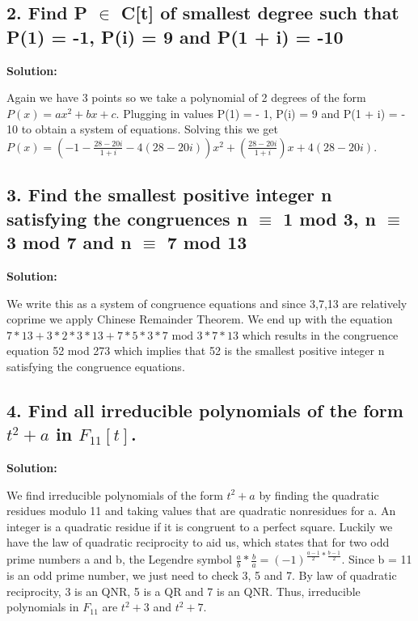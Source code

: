 \documentclass{article}
\begin{document}
\begin{spacing}{1.1}
\vfill

\subsection{2.  Find P $\in$ C[t] of smallest degree such that P(1) = -1, P(i) = 9 and P(1 + i) = -10}

\textbf{Solution: }

Again we have 3 points so we take a polynomial of 2 degrees of the form $P(x)= ax^2 + bx + c$. Plugging in values P(1) = - 1, P(i) = 9 and P(1 + i) = - 10 to obtain a system of equations.  Solving this we get $P(x) = (-1 - \frac{28 - 20i}{1+i} - 4(28-20i))x^2 +(\frac{28 - 20i}{1+i})x + 4(28-20i)$.  
\vfill

\subsection{3.  Find the smallest positive integer n satisfying the congruences n $\equiv$ 1 mod 3, n $\equiv$ 3 mod 7 and n $\equiv$ 7 mod 13}

\textbf{Solution: }

We write this as a system of congruence equations and since 3,7,13 are relatively coprime we apply Chinese Remainder Theorem.  We end up with the equation $7 * 13 + 3 * 2 * 3 * 13 + 7 * 5 * 3 * 7 \text{ mod } 3 * 7 * 13$ which results in the congruence equation 52 mod 273 which implies that 52 is the smallest positive integer n satisfying the congruence equations.  

\vfill

\newpage

\subsection{4. Find all irreducible polynomials of the form $t^2 + a$ in $F_{11}[t]$.}

\textbf{Solution: }

We find irreducible polynomials of the form $t^2 + a$ by finding the quadratic residues modulo 11 and taking 
values that are quadratic nonresidues for a.  An integer is a quadratic residue if it is congruent to a perfect square.  Luckily we have the law of quadratic reciprocity to aid us, which states that for two odd prime numbers a and b, the Legendre symbol $\frac{a}{b} * \frac{b}{a} = (-1)^{\frac{a-1}{2} * \frac{b-1}{2}}$.  Since b = 11 is an odd prime number, we just need to check 3, 5 and 7.  By law of quadratic reciprocity, 3 is an QNR, 5 is a QR and 7 is an QNR.  Thus, irreducible polynomials in $F_{11}$ are $t^2 + 3$ and $t^2 + 7$.  


\end{spacing}
\end{document}
